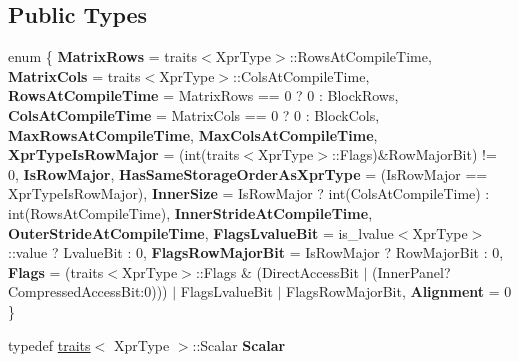 \subsection*{Public Types}
\begin{DoxyCompactItemize}
\item 
\mbox{\label{struct_eigen_1_1internal_1_1traits_3_01_block_3_01_xpr_type_00_01_block_rows_00_01_block_cols_00_01_inner_panel_01_4_01_4_a921522adf9c2b7e3470b0848a65385af}} 
enum \{ \newline
{\bfseries Matrix\+Rows} = traits$<$Xpr\+Type$>$\+::Rows\+At\+Compile\+Time, 
{\bfseries Matrix\+Cols} = traits$<$Xpr\+Type$>$\+::Cols\+At\+Compile\+Time, 
{\bfseries Rows\+At\+Compile\+Time} = Matrix\+Rows == 0 ? 0 \+: Block\+Rows, 
{\bfseries Cols\+At\+Compile\+Time} = Matrix\+Cols == 0 ? 0 \+: Block\+Cols, 
\newline
{\bfseries Max\+Rows\+At\+Compile\+Time}, 
{\bfseries Max\+Cols\+At\+Compile\+Time}, 
{\bfseries Xpr\+Type\+Is\+Row\+Major} = (int(traits$<$Xpr\+Type$>$\+::Flags)\&Row\+Major\+Bit) != 0, 
{\bfseries Is\+Row\+Major}, 
\newline
{\bfseries Has\+Same\+Storage\+Order\+As\+Xpr\+Type} = (Is\+Row\+Major == Xpr\+Type\+Is\+Row\+Major), 
{\bfseries Inner\+Size} = Is\+Row\+Major ? int(Cols\+At\+Compile\+Time) \+: int(Rows\+At\+Compile\+Time), 
{\bfseries Inner\+Stride\+At\+Compile\+Time}, 
{\bfseries Outer\+Stride\+At\+Compile\+Time}, 
\newline
{\bfseries Flags\+Lvalue\+Bit} = is\+\_\+lvalue$<$Xpr\+Type$>$\+::value ? Lvalue\+Bit \+: 0, 
{\bfseries Flags\+Row\+Major\+Bit} = Is\+Row\+Major ? Row\+Major\+Bit \+: 0, 
{\bfseries Flags} = (traits$<$Xpr\+Type$>$\+::Flags \& (Direct\+Access\+Bit $\vert$ (Inner\+Panel?Compressed\+Access\+Bit\+:0))) $\vert$ Flags\+Lvalue\+Bit $\vert$ Flags\+Row\+Major\+Bit, 
{\bfseries Alignment} = 0
 \}
\item 
\mbox{\label{struct_eigen_1_1internal_1_1traits_3_01_block_3_01_xpr_type_00_01_block_rows_00_01_block_cols_00_01_inner_panel_01_4_01_4_a8a33b6df13c733f1d38a16c74bbb864d}} 
typedef \mbox{\hyperlink{struct_eigen_1_1internal_1_1traits}{traits}}$<$ Xpr\+Type $>$\+::Scalar {\bfseries Scalar}
\item 

\end{DoxyCompactItemize}
